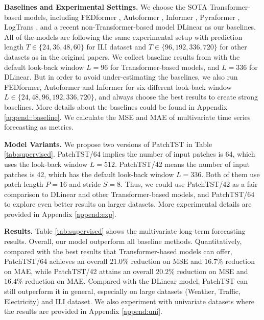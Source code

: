 \documentclass{article} \usepackage{iclr2023_conference,times}
\begin{document}
\begin{table}[htbp!]
\centering
{}
\caption{Statistics of popular datasets for benchmark.}
\label{tab:data}
\end{table}



\textbf{Baselines and Experimental Settings.} We choose the SOTA Transformer-based models, including FEDformer \citep{fedformer}, Autoformer \citep{autoformer}, Informer \citep{informer}, Pyraformer \citep{pyraformer}, LogTrans \citep{logtrans}, and a recent non-Transformer-based model DLinear \citep{dlinear} as our baselines. All of the models are following the same experimental setup with prediction length $T\in \{24, 36, 48, 60\}$ for ILI dataset and $T\in \{96, 192, 336, 720\}$ for other datasets as in the original papers. We collect baseline results from \citet{dlinear} with the default look-back window $L=96$ for Transformer-based models, and $L=336$ for DLinear. But in order to avoid under-estimating the baselines, we also run FEDformer, Autoformer and Informer for six different look-back window $L\in \{24, 48, 96, 192, 336, 720\}$, and always choose the best results to create strong baselines. More details about the baselines could be found in Appendix \ref{append::baseline}. We calculate the MSE and MAE of multivariate time series forecasting as metrics. 

\textbf{Model Variants.} We propose two versions of PatchTST in Table \ref{tab:supervised}. PatchTST/64 implies the number of input patches is 64, which uses the look-back window $L=512$. PatchTST/42 means the number of input patches is 42, which has the default look-back window $L=336$. Both of them use patch length $P=16$ and stride $S=8$. Thus, we could use PatchTST/42 as a fair comparison to DLinear and other Transformer-based models, and PatchTST/64 to explore even better results on larger datasets. More experimental details are provided in Appendix \ref{append:exp}.

\textbf{Results.} Table \ref{tab:supervised} shows the multivariate long-term forecasting results. Overall, our model outperform all baseline methods. Quantitatively, compared with the best results that Transformer-based models can offer, PatchTST/64 achieves an overall $\mathbf{21.0\%}$ reduction on MSE and $\mathbf{16.7\%}$ reduction on MAE, while PatchTST/42 attains an overall $\mathbf{20.2\%}$ reduction on MSE and $\mathbf{16.4\%}$ reduction on MAE. Compared with the DLinear model, PatchTST can still outperform it in general, especially on large datasets (Weather, Traffic, Electricity) and ILI dataset. We also experiment with univariate datasets where the results are provided in Appendix \ref{append:uni}. 
\end{document}
